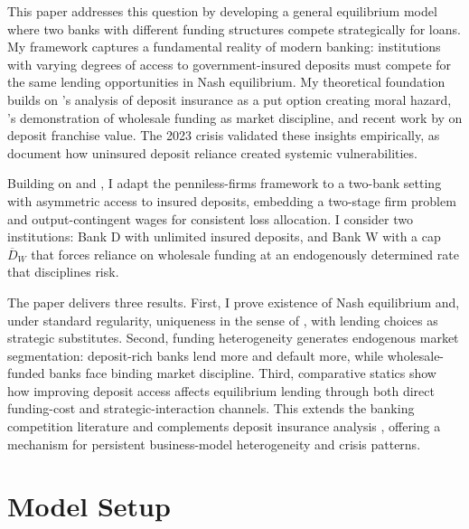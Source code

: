 \documentclass[12pt]{article}
\begin{document}
This paper addresses this question by developing a general equilibrium model where two banks with different funding structures compete strategically for loans. My framework captures a fundamental reality of modern banking: institutions with varying degrees of access to government-insured deposits must compete for the same lending opportunities in Nash equilibrium. My theoretical foundation builds on \citet{Merton1977}'s analysis of deposit insurance as a put option creating moral hazard, \citet{CalomirisKahn1991}'s demonstration of wholesale funding as market discipline, and recent work by \citet{DrechslerSavovSchnabl2021} on deposit franchise value. The 2023 crisis validated these insights empirically, as \citet{JiangEtAl2024} document how uninsured deposit reliance created systemic vulnerabilities.

Building on \citet{Malherbe2020} and \citet{BahajMalherbe2020}, I adapt the penniless-firms framework to a two-bank setting with asymmetric access to insured deposits, embedding a two-stage firm problem and output-contingent wages for consistent loss allocation. I consider two institutions: Bank D with unlimited insured deposits, and Bank W with a cap \(\overline{D}_W\) that forces reliance on wholesale funding at an endogenously determined rate that disciplines risk.

The paper delivers three results. First, I prove existence of Nash equilibrium and, under standard regularity, uniqueness in the sense of \citet{Rosen1965}, with lending choices as strategic substitutes. Second, funding heterogeneity generates endogenous market segmentation: deposit-rich banks lend more and default more, while wholesale-funded banks face binding market discipline. Third, comparative statics show how improving deposit access affects equilibrium lending through both direct funding-cost and strategic-interaction channels. This extends the banking competition literature \citep{BoydDeNicolo2005, MartinezMieraRepullo2010} and complements deposit insurance analysis \citep{AllenGale2000, DavilaGoldstein2023}, offering a mechanism for persistent business-model heterogeneity and crisis patterns.

 


\section{Model Setup}
\end{document}
